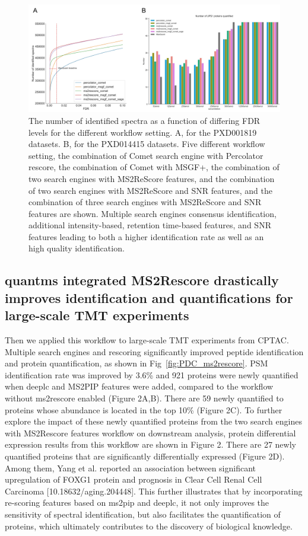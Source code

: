 \documentclass[12pt]{article}
\begin{document}
\begin{figure}[h!]
	\centering
	\includegraphics[width=1\textwidth]{figures//PXD001819.jpg}
	\caption{The number of identified spectra as a function of differing FDR levels for the different workflow setting. A, for the PXD001819 datasets. B, for the PXD014415 datasets. Five different workflow setting, the combination of Comet search engine with Percolator rescore, the combination of Comet with MSGF+, the combination of two search engines with MS2ReScore features, and the combination of two search engines with MS2ReScore and SNR features, and the combination of three search engines with MS2ReScore and SNR features are shown. Multiple search engines consensus identification, additional intensity-based, retention time-based features, and SNR features leading to both a higher identification rate as well as an high quality identification.}
	\label{fig:PXD001819_ms2rescore_pic}
\end{figure}


\subsection{quantms integrated MS2Rescore drastically improves identification and quantifications for large-scale TMT experiments}
Then we applied this workflow to large-scale TMT experiments from CPTAC. Multiple search engines and rescoring significantly improved peptide identification and protein quantification, as shown in Fig~\ref{fig:PDC_ms2rescore}. PSM identification rate was improved by 3.6\% and 921 proteins were newly quantified when deeplc and MS2PIP features were added, compared to the workflow without ms2rescore enabled (Figure 2A,B). There are 59 newly quantified to proteins whose abundance is located in the top 10\% (Figure 2C). To further explore the impact of these newly quantified proteins from the two search engines with MS2Rescore features workflow on downstream analysis, protein differential expression results from this workflow are shown in Figure 2. There are 27 newly quantified proteins that are significantly differentially expressed (Figure 2D). Among them, Yang et al. reported an association between significant upregulation of FOXG1 protein and prognosis in Clear Cell Renal Cell Carcinoma [10.18632/aging.204448]. This further illustrates that by incorporating re-scoring features based on ms2pip and deeplc, it not only improves the sensitivity of spectral identification, but also facilitates the quantification of proteins, which ultimately contributes to the discovery of biological knowledge. 
\end{document}
